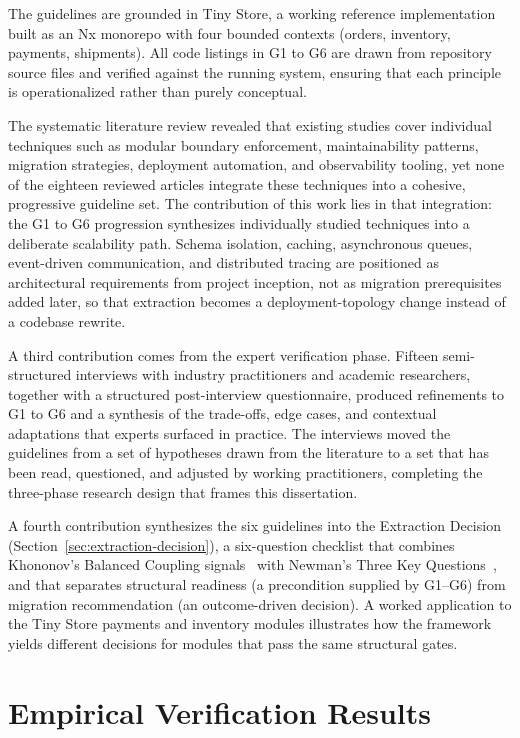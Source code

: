 The guidelines are grounded in Tiny Store, a working reference implementation built as an Nx monorepo with four bounded contexts (orders, inventory, payments, shipments). All code listings in G1 to G6 are drawn from repository source files and verified against the running system, ensuring that each principle is operationalized rather than purely conceptual.

The systematic literature review revealed that existing studies cover individual techniques such as modular boundary enforcement, maintainability patterns, migration strategies, deployment automation, and observability tooling, yet none of the eighteen reviewed articles integrate these techniques into a cohesive, progressive guideline set. The contribution of this work lies in that integration: the G1 to G6 progression synthesizes individually studied techniques into a deliberate scalability path. Schema isolation, caching, asynchronous queues, event-driven communication, and distributed tracing are positioned as architectural requirements from project inception, not as migration prerequisites added later, so that extraction becomes a deployment-topology change instead of a codebase rewrite.

A third contribution comes from the expert verification phase. Fifteen semi-structured interviews with industry practitioners and academic researchers, together with a structured post-interview questionnaire, produced refinements to G1 to G6 and a synthesis of the trade-offs, edge cases, and contextual adaptations that experts surfaced in practice. The interviews moved the guidelines from a set of hypotheses drawn from the literature to a set that has been read, questioned, and adjusted by working practitioners, completing the three-phase research design that frames this dissertation.

A fourth contribution synthesizes the six guidelines into the Extraction Decision (Section~\ref{sec:extraction-decision}), a six-question checklist that combines Khononov's Balanced Coupling signals~\cite{khononov2024balancing} with Newman's Three Key Questions~\cite{newman2019monolith}, and that separates structural readiness (a precondition supplied by G1--G6) from migration recommendation (an outcome-driven decision). A worked application to the Tiny Store payments and inventory modules illustrates how the framework yields different decisions for modules that pass the same structural gates.

\section{Empirical Verification Results}

